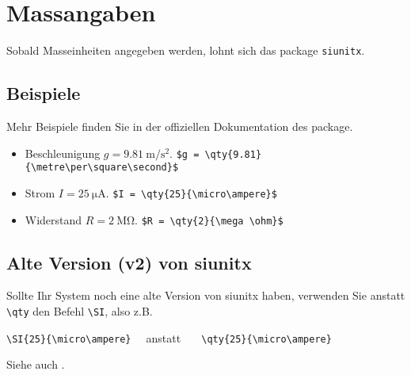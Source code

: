 \chapter{Massangaben}\label{sec:massangaben}

Sobald Masseinheiten angegeben werden, lohnt sich das package
{\tt siunitx}\cite{siunitx}.


\section{Beispiele}
Mehr Beispiele finden Sie in der offiziellen Dokumentation des package.
\begin{itemize}
	\item Beschleunigung $g = \qty{9.81}{\metre\per\square\second}$. 
	\verb+$g = \qty{9.81}{\metre\per\square\second}$+
%
	\item Strom $I = \qty{25}{\micro\ampere}$.
		\verb+$I = \qty{25}{\micro\ampere}$+
	\item Widerstand $R = \qty{2}{\mega \ohm}$.
		\verb+$R = \qty{2}{\mega \ohm}$+
\end{itemize}

\section{Alte Version (v2) von siunitx}
Sollte Ihr System noch eine alte Version von siunitx haben, verwenden Sie
anstatt \verb+\qty+ den Befehl \verb+\SI+, also z.B.

\verb+\SI{25}{\micro\ampere}  +
anstatt
\verb+   \qty{25}{\micro\ampere}+

Siehe auch \cite{qty-vs-si}.

